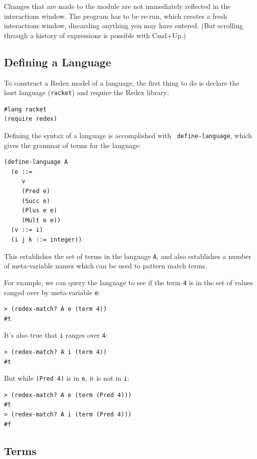 Changes that are made to the module are not immediately reflected in
the interactions window.  The program has to be re-run, which creates
a fresh interactions window, discarding anything you may have entered.
(But scrolling through a history of expressions is possible with
Cmd+Up.)



\subsection{Defining a Language}

To construct a Redex model of a language, the first thing to do is
declare the host language ({\tt racket}) and require the Redex
library:
\begin{verbatim}
#lang racket
(require redex)
\end{verbatim}

Defining the syntax of a language is accomplished with {\tt
  define-language}, which gives the grammar of terms for the language:
\begin{verbatim}
(define-language A
  (e ::= 
     v
     (Pred e)
     (Succ e)
     (Plus e e)
     (Mult e e))
  (v ::= i)
  (i j k ::= integer))
\end{verbatim}
This establishes the set of terms in the language {\tt A}, and also
establishes a number of meta-variable names which can be used to
pattern match terms.

For example, we can query the language to see if the term {\tt 4} is
in the set of values ranged over by meta-variable {\tt e}:
\begin{verbatim}
> (redex-match? A e (term 4))
#t
\end{verbatim}
It's also true that {\tt i} ranges over {\tt 4}:
\begin{verbatim}
> (redex-match? A i (term 4))
#t
\end{verbatim}
But while {\tt (Pred 4)} is in {\tt e}, it is not in {\tt i}:
\begin{verbatim}
> (redex-match? A e (term (Pred 4)))
#t
> (redex-match? A i (term (Pred 4)))
#f
\end{verbatim}

\subsection{Terms}


